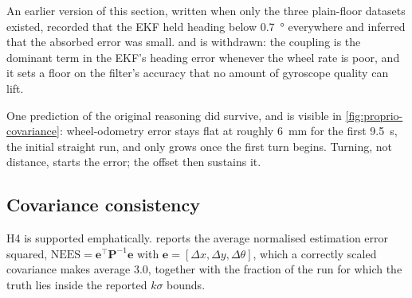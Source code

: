 An earlier version of this section, written when only the three plain-floor
datasets existed, recorded that the EKF held heading below \SI{0.7}{\degree}
everywhere and inferred that the absorbed error was small.  and is withdrawn: the coupling is
the dominant term in the EKF's heading error whenever the wheel rate is poor, and
it sets a floor on the filter's accuracy that no amount of gyroscope quality can
lift.

One prediction of the original reasoning did survive, and is visible in
\cref{fig:proprio-covariance}: wheel-odometry error stays flat at roughly
\SI{6}{\milli\metre} for the first \SI{9.5}{\second}, the initial straight run,
and only grows once the first turn begins. Turning, not distance, starts the
error; the offset then sustains it.

\subsection{Covariance consistency}

H4 is supported emphatically.  reports the average
normalised estimation error squared,
$\mathrm{NEES}=\mathbf{e}^{\top}\mathbf{P}^{-1}\mathbf{e}$ with
$\mathbf{e}=[\Delta x,\Delta y,\Delta\theta]$, which a correctly scaled covariance
makes average 3.0, together with the fraction of the run for which the truth lies
inside the reported $k\sigma$ bounds.

